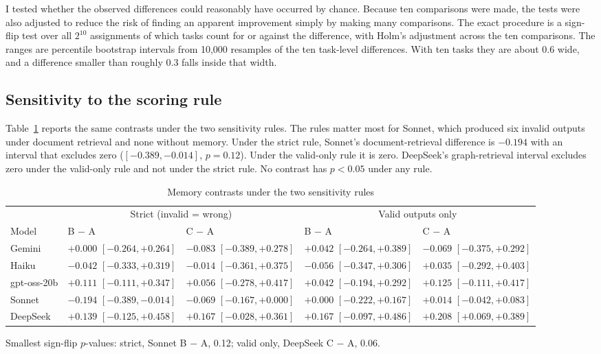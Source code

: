 \documentclass[11pt]{article}
\begin{document}
I tested whether the observed differences could reasonably have occurred by chance. Because ten comparisons were made, the tests were also adjusted to reduce the risk of finding an apparent improvement simply by making many comparisons. The exact procedure is a sign-flip test over all $2^{10}$ assignments of which tasks count for or against the difference, with Holm's adjustment across the ten comparisons. The ranges are percentile bootstrap intervals from 10,000 resamples of the ten task-level differences. With ten tasks they are about 0.6 wide, and a difference smaller than roughly 0.3 falls inside that width.

\subsection*{Sensitivity to the scoring rule}

Table~\ref{tab:sensitivity} reports the same contrasts under the two sensitivity rules. The rules matter most for Sonnet, which produced six invalid outputs under document retrieval and none without memory. Under the strict rule, Sonnet's document-retrieval difference is $-0.194$ with an interval that excludes zero ($[-0.389, -0.014]$, $p = 0.12$). Under the valid-only rule it is zero. DeepSeek's graph-retrieval interval excludes zero under the valid-only rule and not under the strict rule. No contrast has $p < 0.05$ under any rule.

\begin{table}[ht]
\centering
\caption{Memory contrasts under the two sensitivity rules}
\label{tab:sensitivity}
\small
\begin{tabular}{lllll}
\toprule
 & \multicolumn{2}{c}{Strict (invalid = wrong)} & \multicolumn{2}{c}{Valid outputs only} \\
\cmidrule(lr){2-3}\cmidrule(lr){4-5}
Model & B $-$ A & C $-$ A & B $-$ A & C $-$ A \\
\midrule
Gemini & $+0.000$ $[-0.264, +0.264]$ & $-0.083$ $[-0.389, +0.278]$ & $+0.042$ $[-0.264, +0.389]$ & $-0.069$ $[-0.375, +0.292]$ \\
Haiku & $-0.042$ $[-0.333, +0.319]$ & $-0.014$ $[-0.361, +0.375]$ & $-0.056$ $[-0.347, +0.306]$ & $+0.035$ $[-0.292, +0.403]$ \\
gpt-oss-20b & $+0.111$ $[-0.111, +0.347]$ & $+0.056$ $[-0.278, +0.417]$ & $+0.042$ $[-0.194, +0.292]$ & $+0.125$ $[-0.111, +0.417]$ \\
Sonnet & $-0.194$ $[-0.389, -0.014]$ & $-0.069$ $[-0.167, +0.000]$ & $+0.000$ $[-0.222, +0.167]$ & $+0.014$ $[-0.042, +0.083]$ \\
DeepSeek & $+0.139$ $[-0.125, +0.458]$ & $+0.167$ $[-0.028, +0.361]$ & $+0.167$ $[-0.097, +0.486]$ & $+0.208$ $[+0.069, +0.389]$ \\
\bottomrule
\end{tabular}

\vspace{0.4em}
\begin{minipage}{0.92\linewidth}\footnotesize
Smallest sign-flip $p$-values: strict, Sonnet B $-$ A, 0.12; valid only, DeepSeek C $-$ A, 0.06.
\end{minipage}
\end{table}

\FloatBarrier
\end{document}
